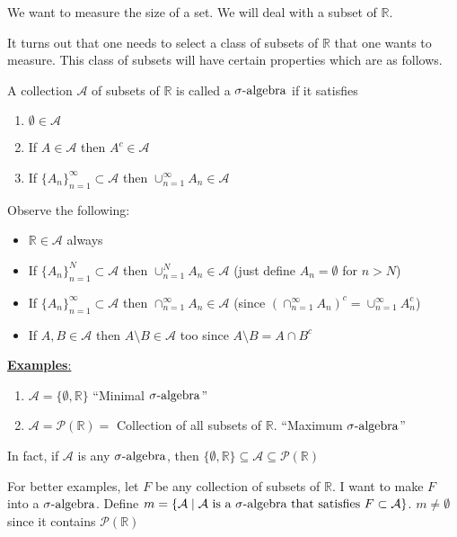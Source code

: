 We want to measure the size of a set.
We will deal with a subset of $\mathbb{R}$.

It turns out that one needs to select a class of subsets of $\mathbb{R}$ that one wants to measure.
This class of subsets will have certain properties which are as follows.

\begin{definition}[$\siga$]
    A collection $\mathcal{A}$ of subsets of $\mathbb{R}$ is called a $\siga$ if it satisfies
    \begin{enumerate}
        \item $\emptyset \in \mathcal{A}$
        \item If $A \in \mathcal{A}$ then $A^c \in \mathcal{A}$
        \item If $\{ A_n \}_{n=1}^{\infty} \subset \mathcal{A}$ then $\cup_{n=1}^{\infty} A_n \in \mathcal{A}$
    \end{enumerate}
\end{definition}

Observe the following:
\begin{itemize}
    \item $\mathbb{R} \in \mathcal{A}$ always
    \item If $\{ A_n \}_{n=1}^{N} \subset \mathcal{A}$ then $\cup_{n=1}^{N} A_n \in \mathcal{A}$ (just define $A_n = \emptyset$ for $n > N$)
    \item If $\{ A_n \}_{n=1}^{\infty} \subset \mathcal{A}$ then $\cap_{n=1}^{\infty} A_n \in \mathcal{A}$ (since $(\cap_{n=1}^{\infty} A_n)^c = \cup_{n=1}^{\infty} A_{n}^{c}$)
    \item If $A,B \in \mathcal{A}$ then $A \setminus B \in \mathcal{A}$ too since $A \setminus B = A \cap B^c$
\end{itemize}

\underline{\textbf{Examples}:}

\begin{enumerate}
    \item $\mathcal{A} = \{ \emptyset, \mathbb{R} \}$ ``Minimal $\siga$''
    \item $\mathcal{A} = \mathcal{P}(\mathbb{R}) = $ Collection of all subsets of $\mathbb{R}$.
    ``Maximum $\siga$''
\end{enumerate}

In fact, if $\mathcal{A}$ is any $\siga$, then $\{ \emptyset,\mathbb{R} \} \subseteq \mathcal{A} \subseteq \mathcal{P}(\mathbb{R})$

For better examples, let $F$ be any collection of subsets of $\mathbb{R}$.
I want to make $F$ into a $\siga$.
Define $m = \{ \mathcal{A} \mid \mathcal{A} \text{ is a } \sigma\text{-algebra} \text{ that satisfies } F \subset \mathcal{A} \}$.
$m \neq \emptyset$ since it contains $\mathcal{P}(\mathbb{R})$

